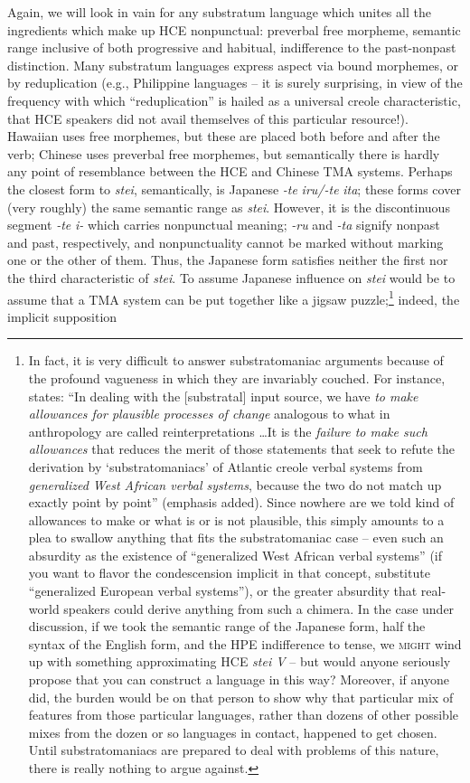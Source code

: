 Again, we will look in vain for any substratum language which unites all the ingredients which make up HCE nonpunctual: preverbal free morpheme, semantic range inclusive of both progressive and habi\-tual, indifference to the past-nonpast distinction. Many substratum languages express aspect via bound morphemes, or by reduplication (e.g., Philippine languages -- it is surely surprising, in view of the fre\-quency with which ``reduplication'' is hailed as a universal creole characteristic, that HCE speakers did not avail themselves of this particular resource!). Hawaiian uses free morphemes, but these are placed both before and after the verb; Chinese uses preverbal free morphemes, but semantically there is hardly any point of resemblance between the HCE and Chinese TMA systems. Perhaps the closest form to \textit{stei}, semantically, is Japanese \textit{-te} \textit{iru/-te} \textit{ita}; these forms cover (very roughly) the same semantic range as \textit{stei}. However, it is the discontinuous segment \textit{-te} \textit{i-} which carries nonpunctual meaning; \textit{-ru} and \textit{-ta} signify nonpast and past, respectively, and nonpunctuality cannot be marked without marking one or the other of them. Thus, the Japanese form satisfies neither the first nor the third characteristic of \textit{stei}. To assume Japanese influence on \textit{stei} would be to assume that a TMA system can be put together like a jigsaw puzzle;\footnote{In fact, it is very difficult to answer substratomaniac argu\-ments because of the profound vagueness in which they are invariably couched. For instance, \citet{Alleyne1979} states: ``In dealing with the [substratal] input source, we have \textit{to make allowances for plausible processes of change} analogous to what in anthropology are called reinterpretations \ldots  It is the \textit{failure to make such allowances} that reduces the merit of those statements that seek to refute the derivation by `substratomaniacs' of Atlantic creole verbal systems from \textit{generalized West African verbal systems}, because the two do not match up exactly point by point'' (emphasis added). Since nowhere are we told kind of allowances to make or what is or is not plausible, this simply amounts to a plea to swallow anything that fits the substratomaniac case -- even such an absurdity as the existence of ``generalized West African verbal systems'' (if you want to flavor the condescension implicit in that concept, substitute ``generalized European verbal systems''), or the greater absurdity that real-world speakers could derive anything from such a chimera. In the case under discussion, if we took the semantic range of the Japanese form, half the syntax of the English form, and the HPE indifference to tense, we \textsc{might} wind up with something approximating HCE \textit{stei V} -- but would anyone seriously propose that you can construct a language in this way? Moreover, if anyone did, the burden would be on that person to show why that particular mix of features from those particular languages, rather than dozens of other possible mixes from the dozen or so lan\-guages in contact, happened to get chosen. Until substratomaniacs are prepared to deal with problems of this nature, there is really nothing to argue against.} indeed, the implicit supposition 